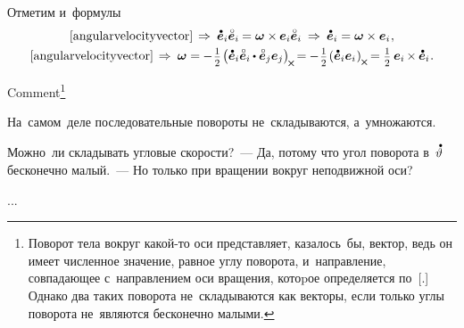 \begin{otherlanguage}{russian}
\vspace{-0.25em}
Отметим и~формулы
\nopagebreak\vspace{.16em}\begin{equation}\label{angularvelocityandbasisvectors}
\begin{array}{c}
\eqref{angularvelocityvector} \hspace{.32ex} \Rightarrow\:
\mathdotabove{\bm{e}}_i \mathcircabove{\bm{e}}_i \hspace{-0.1ex} = \bm{\omega} \times \hspace{-0.1ex} \bm{e}_i \mathcircabove{\bm{e}}_i \:\Rightarrow\:
\mathdotabove{\bm{e}}_i = \bm{\omega} \times \bm{e}_i \hspace{0.12ex}, \\[.32em]
%
\eqref{angularvelocityvector} \hspace{.32ex} \Rightarrow\:
\bm{\omega} = \hspace{-0.1ex} - \hspace{0.16ex} \smalldisplaystyleonehalf \hspace{-.2ex} \left( \mathdotabove{\bm{e}}_i \mathcircabove{\bm{e}}_i \hspace{-0.1ex} \dotp \mathcircabove{\bm{e}}_j \bm{e}_j \right)_{\hspace{-0.25ex}\Xcompanion} \hspace{-0.32ex}
= \hspace{-0.1ex} - \hspace{0.16ex} \smalldisplaystyleonehalf \hspace{-.2ex} \left( \mathdotabove{\bm{e}}_i \bm{e}_i \hspace{.1ex} \right)_{\hspace{-0.1ex}\Xcompanion} \hspace{-0.25ex}
= \smalldisplaystyleonehalf \hspace{0.4ex} \bm{e}_i \hspace{-0.16ex} \times \hspace{-0.1ex} \mathdotabove{\bm{e}}_i \hspace{0.12ex}.
\end{array}
\end{equation}



Comment\footnote{Поворот тела вокруг какой\hbox{-}то оси представляет, казалось~бы, вектор, ведь он имеет численное значение, равное углу поворота, и~направление, совпадающее с~направлением оси вращения, котоpое определяется по~[.] Однако два таких поворота не~складываются как векторы, если только углы поворота не~являются бесконечно малыми.}

На~самом~деле последовательные повороты не~складываются, а~умножаются.

Можно~ли складывать угловые скорости?~--- Да, потому что угол поворота в~$\mathdotabove{\vartheta}$ бесконечно малый.~--- Но только при вращении вокруг неподвижной оси?

...



\end{otherlanguage}

